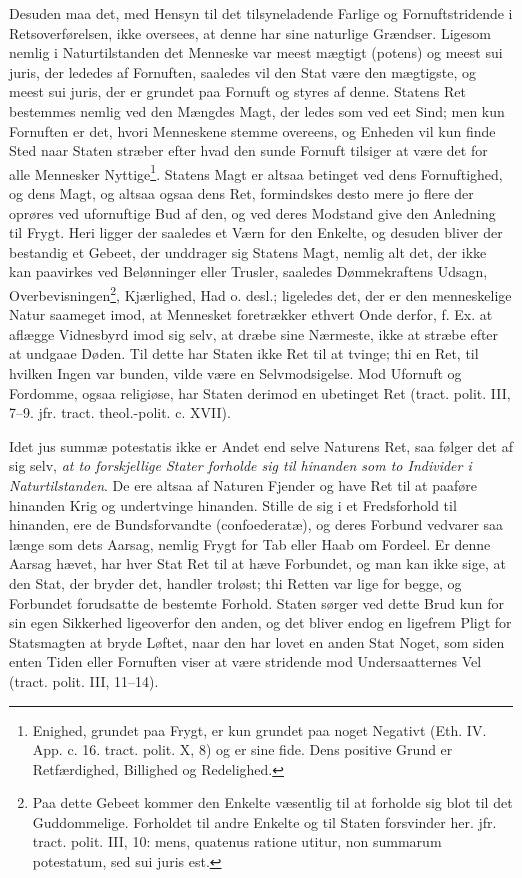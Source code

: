 \documentclass[12pt,a4paper]{book}
\newcommand{\opage}[1]{\marginnote{\footnotesize\textit{[#1]}}}
\begin{document}
Desuden maa det, med Hensyn til det tilsyneladende Farlige og Fornuftstridende i Retsoverførelsen, ikke oversees, at denne har sine naturlige Grændser. Ligesom nemlig i Naturtilstanden det Menneske var meest mægtigt (potens) og meest sui juris, der lededes af Fornuften, saaledes vil den Stat være den mægtigste, og meest sui juris, der er grundet paa Fornuft og styres af denne. Statens Ret bestemmes nemlig ved den Mængdes Magt, der ledes som ved eet Sind; men kun Fornuften er det, hvori Menneskene stemme overeens, og Enheden vil kun finde Sted naar Staten stræber efter hvad den sunde Fornuft tilsiger at være det for alle Mennesker Nyttige\footnote{Enighed, grundet paa Frygt, er kun grundet paa noget Negativt (Eth. IV. App. c. 16. tract. polit. X, 8) og er sine fide. Dens positive Grund er Retfærdighed, Billighed og Redelighed.}. Statens Magt er altsaa betinget ved dens Fornuftighed, og dens Magt, og altsaa ogsaa dens Ret, formindskes desto mere jo flere der oprøres ved ufornuftige Bud af den, og ved deres Modstand give den Anledning til Frygt. Heri ligger der saaledes et Værn for den Enkelte, og desuden bliver der bestandig et Gebeet, der unddrager sig Statens Magt, nemlig alt det, der ikke kan paavirkes ved Belønninger eller Trusler, saaledes Dømmekraftens Udsagn, Overbevisningen\footnote{Paa dette Gebeet kommer den Enkelte væsentlig til at forholde sig blot til det Guddommelige. Forholdet til andre Enkelte og til Staten forsvinder her. jfr. tract. polit. III, 10: mens, quatenus ratione utitur, non summarum potestatum, sed sui juris est.}, Kjærlighed, Had o. desl.; ligeledes det, der er den menneskelige Natur saameget imod, at Mennesket foretrækker ethvert Onde derfor, f. Ex. at aflægge Vidnesbyrd imod sig selv, at dræbe sine Nærmeste, ikke at stræbe efter at undgaae Døden. Til dette har Staten ikke Ret til at tvinge; thi en Ret, til hvilken Ingen var
\opage{141} bunden, vilde være en Selvmodsigelse. Mod Ufornuft og Fordomme, ogsaa religiøse, har Staten derimod en ubetinget Ret (tract. polit. III, 7--9. jfr. tract. theol.-polit. c. XVII).

Idet jus summæ potestatis ikke er Andet end selve Naturens Ret, saa følger det af sig selv, \emph{at to forskjellige Stater forholde sig til hinanden som to Individer i Naturtilstanden}. De ere altsaa af Naturen Fjender og have Ret til at paaføre hinanden Krig og undertvinge hinanden. Stille de sig i et Fredsforhold til hinanden, ere de Bundsforvandte (confoederatæ), og deres Forbund vedvarer saa længe som dets Aarsag, nemlig Frygt for Tab eller Haab om Fordeel. Er denne Aarsag hævet, har hver Stat Ret til at hæve Forbundet, og man kan ikke sige, at den Stat, der bryder det, handler troløst; thi Retten var lige for begge, og Forbundet forudsatte de bestemte Forhold. Staten sørger ved dette Brud kun for sin egen Sikkerhed ligeoverfor den anden, og det bliver endog en ligefrem Pligt for Statsmagten at bryde Løftet, naar den har lovet en anden Stat Noget, som siden enten Tiden eller Fornuften viser at være stridende mod Undersaatternes Vel (tract. polit. III, 11--14).
\end{document}
